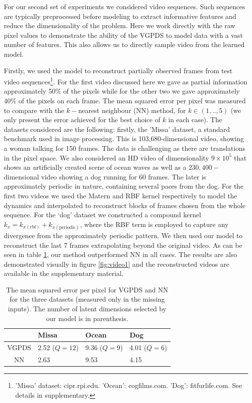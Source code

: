 \documentclass{article} %
\begin{document}
For our second set of experiments we considered video sequences. Such
sequences are typically preprocessed before modeling to extract
informative features and reduce the dimensionality of the
problem. Here we work directly with the raw pixel values to
demonstrate the ability of the VGPDS to model data with a vast number
of features. This also allows us to directly sample video from the
learned model.
\par Firstly, we used the
model to reconstruct partially observed frames from test video
sequences\footnote{'Missa' dataset: cipr.rpi.edu. 'Ocean': cogfilms.com. 'Dog': fitfurlife.com. See details in supplementary.}. For the first video discussed here we gave as partial information approximately 
50\% of the pixels while for the other two we gave approximately 40\% of the pixels on each frame.
The mean squared error per pixel was measured to compare
with the $k-$nearest neighbour (NN) method, for $k \in (1,..,5)$ (we
only present the error achieved for the best choice of $k$ in each
case). The datasets considered are the following: firstly, the 'Missa'
dataset, a standard benchmark used in image
processing. This is 103,680-dimensional video, showing a woman talking
for 150 frames. The data is challenging as there are translations in
the pixel space. We also considered an HD video of dimensionality $9
\times 10^5$ that shows an artificially created scene of ocean waves
as well as a $230,400-$dimensional video showing
a dog running for $60$ frames. The later is approximately periodic in
nature, containing several paces from the dog. For the first two
videos we used the Matern and RBF kernel respectively to model the
dynamics and interpolated to reconstruct blocks of frames chosen from
the whole sequence. For the `dog' dataset we constructed a compound
kernel $k_x = k_{x(\text{rbf})} + k_{x(\text{periodic})}$, where the
RBF term is employed to capture any divergence from the approximately
periodic pattern. We then used our model to reconstruct the last 7
frames extrapolating beyond the original video. As can be seen in
table \ref{videoResultsTable}, our method outperformed NN in all
cases. The results are also demonstrated visually in figure
\ref{fig:video1} and the reconstructed videos are available in the supplementary material.


\begin{table}[h]
\caption{
\small{
The mean squared error per pixel for VGPDS and NN for the three datasets (measured only in the missing inputs). The number of latent dimensions selected by our model is in parenthesis. 
} }
\label{videoResultsTable}
\begin{center}
\begin{tabular}{c||l|l|l}
  & Missa & Ocean & Dog \\
\hline \hline
VGPDS  & 2.52 ($Q = 12$) & 9.36 ($Q = 9$)  & 4.01 ($Q = 6$) \\  \hline
NN  & 2.63 & 9.53 & 4.15 \\
\end{tabular}
\end{center}
\end{table}
\end{document}
